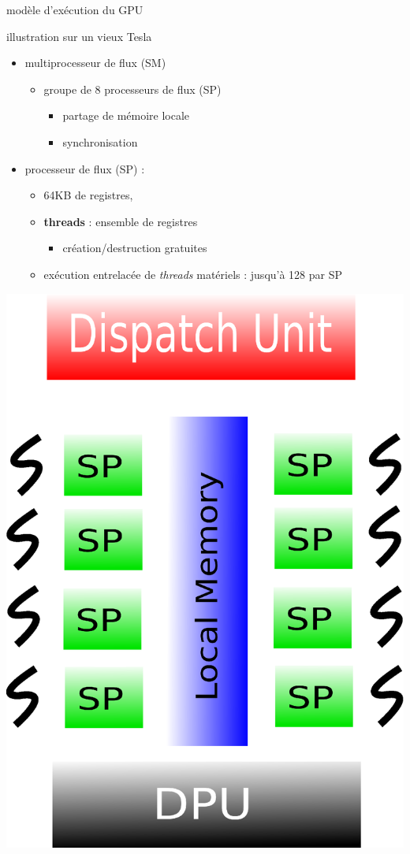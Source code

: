 \documentclass[11pt,mathserif]{beamer}
\begin{document}
\begin{frame}{modèle d'exécution du GPU}
  \begin{flushright}
    illustration sur un vieux Tesla
  \end{flushright}
\begin{minipage}[c]{0.49\linewidth}
\begin{itemize}
  \item multiprocesseur de flux (SM)
    \begin{itemize}
      \item groupe de 8 processeurs de flux (SP)
        \begin{itemize}
          \item partage de mémoire locale
          \item synchronisation
        \end{itemize}
    \end{itemize}
  \item processeur de flux (SP) : 
    \begin{itemize}
    \item 64KB de registres, 
    \item {\bf threads} : ensemble de registres
    \begin{itemize}
      \item création/destruction gratuites
    \end{itemize}
  \item exécution entrelacée de {\em threads} matériels : jusqu'à 128 par SP
    \end{itemize}
\end{itemize}
\end{minipage}
\begin{minipage}[c]{0.49\linewidth}
\begin{center}
  \includegraphics[width=0.6\linewidth]{fig/GPUArchiThread.eps}
\end{center}
\end{minipage}
\end{frame}
\end{document}
